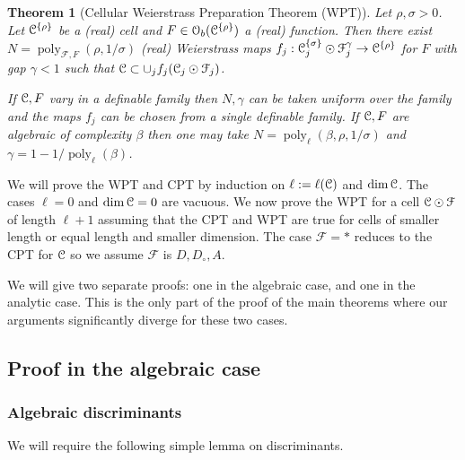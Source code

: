 \documentclass[reqno]{amsart}
\newtheorem{Thm}{Theorem}{\bfseries}{\itshape}
\renewcommand\~[1]{\widetilde{#1}}
\def\poly{\operatorname{poly}} \def\J{\operatorname{J}}
\def\cF{{\mathcal F}} \def\cL{{\mathcal L}} \def\cR{{\mathcal R}}
\def\cO{{\mathcal O}}
\def\he#1{{\{#1\}}}
\def\hrho{{\he\rho}}
\def\hsigma{{\he\sigma}}
\begin{document}
\begin{Thm}[Cellular Weierstrass Preparation Theorem (WPT)]\label{thm:wpt}
  Let $\rho,\sigma>0$. Let $\cC^\hrho$ be a (real) cell and
  $F\in\cO_b(\cC^\hrho)$ a (real) function. Then there exist
  $N=\poly_{\cF,F}(\rho,1/\sigma)$ (real) Weierstrass maps
  $f_j:\cC_j^\hsigma\odot\cF_j^\gamma\to\cC^\hrho$ for $F$ with gap
  $\gamma<1$ such that $\cC\subset\cup_j f_j(\cC_j\odot\cF_j)$.

  If ${\mathcal C},F$ vary in a definable family then $N,\gamma$ can be taken
  uniform over the family and the maps $f_j$ can be chosen from a
  single definable family. If ${\mathcal C},F$ are algebraic of complexity
  $\beta$ then one may take $N=\poly_\ell(\beta,\rho,1/\sigma)$ and
  $\gamma=1-1/\poly_\ell(\beta)$.
\end{Thm}

We will prove the WPT and CPT by induction on $\ell:=\ell({\mathcal C})$ and
$\dim{\mathcal C}$. The cases $\ell=0$ and $\dim{\mathcal C}=0$ are vacuous. We now
prove the WPT for a cell $\cC\odot\cF$ of length $\ell+1$ assuming
that the CPT and WPT are true for cells of smaller length or equal
length and smaller dimension. The case $\cF=*$ reduces to the CPT for
${\mathcal C}$ so we assume $\cF$ is $D,D_\circ,A$.

We will give two separate proofs: one in the algebraic case, and one
in the analytic case. This is the only part of the proof of the main
theorems where our arguments significantly diverge for these two
cases. 

\subsection{Proof in the algebraic case}
\label{sec:weierstrass-alg-proof}

\subsubsection{Algebraic discriminants}
We will require the following simple lemma on discriminants.
\end{document}
